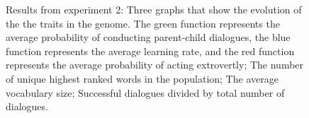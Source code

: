\begin{figure}
    \centering
    \ContinuedFloat
    \hfill
    \par \bigskip
    \hfill
    \caption{Results from experiment 2:  Three graphs that show the evolution of the the traits in the genome. The green function represents the average probability of conducting parent-child dialogues, the blue function represents the average learning rate, and the red function represents the average probability of acting extrovertly;  The number of unique highest ranked words in the population;  The average vocabulary size;  Successful dialogues divided by total number of dialogues.}
    \label{fig:exp2.1}
\end{figure}
